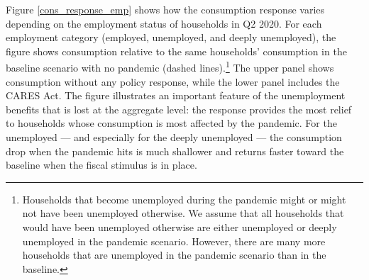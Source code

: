\documentclass[titlepage,a4paper]{\econtex}
\begin{document}
Figure \ref{cons_response_emp} shows how the consumption response varies depending on the employment status of households in Q2 2020.
For each employment category (employed, unemployed, and deeply unemployed), the figure shows consumption relative to the same households' consumption in the baseline scenario with no pandemic (dashed lines).\footnote{Households that become unemployed during the pandemic might or might not have been unemployed otherwise. We assume that all households that would have been unemployed otherwise are either unemployed or deeply unemployed in the pandemic scenario. However, there are many more households that are unemployed in the pandemic scenario than in the baseline.}
The upper panel shows consumption without any policy response, while the lower panel includes the CARES Act.
The figure illustrates an important feature of the unemployment benefits that is lost at the aggregate level: the response provides the most relief to households whose consumption is most affected by the pandemic.
For the unemployed --- and especially for the deeply unemployed --- the consumption drop when the pandemic hits is much shallower and returns faster toward the baseline when the fiscal stimulus is in place.
\end{document}
